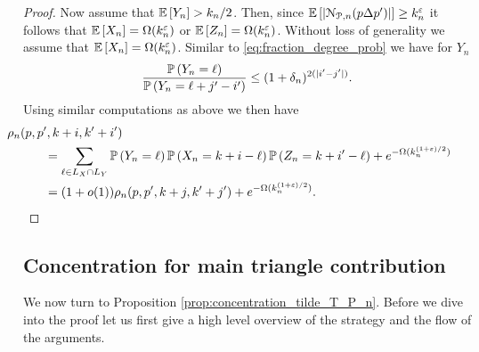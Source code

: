 \begin{proof}
Now assume that $\mathbb{E}\left[Y_n\right] > k_n/2$. Then, since $\mathbb{E}\left[\left|{\mathcal N}_{{\mathcal P},n}(p \Delta p^\prime)\right|\right] \ge k_n^{\varepsilon}$ it follows that $\mathbb{E}\left[X_n\right] = \Omega(k_n^\varepsilon)$ or $\mathbb{E}\left[Z_n\right] = \Omega(k_n^\varepsilon)$. Without loss of generality we assume that $\mathbb{E}\left[X_n\right] = \Omega(k_n^\varepsilon)$. Similar to \eqref{eq:fraction_degree_prob} we have for $Y_n$
\[
	\frac{\mathbb{P}\left(Y_n = \ell\right)}{\mathbb{P}\left(Y_n = \ell + j^\prime - i^\prime\right)} \le (1 + \delta_n)^{2(|i^\prime - j^\prime|)}.
\]
Using similar computations as above we then have
\begin{align*}
	&\hspace{-30pt}\rho_n(p,p^\prime,k+i,k^\prime+i^\prime) \\
	&= \sum_{\ell \in L_X \cap L_Y} \Prob{Y_n = \ell} \Prob{X_n = k + i - \ell}
		\Prob{Z_n = k + i^\prime - \ell}  + e^{-\Omega(k_n^{(1+\varepsilon)/2})}\\
	&= (1+o(1))\rho_n(p,p^\prime,k+j,k^\prime+j^\prime) + e^{-\Omega(k_n^{(1+\varepsilon)/2})}.
\end{align*}
\end{proof}

\subsection{Concentration for main triangle contribution}\label{ssec:concentration_tilde_T}

We now turn to Proposition \ref{prop:concentration_tilde_T_P_n}. Before we dive into the proof let us first give a high level overview of the strategy and the flow of the arguments. 

